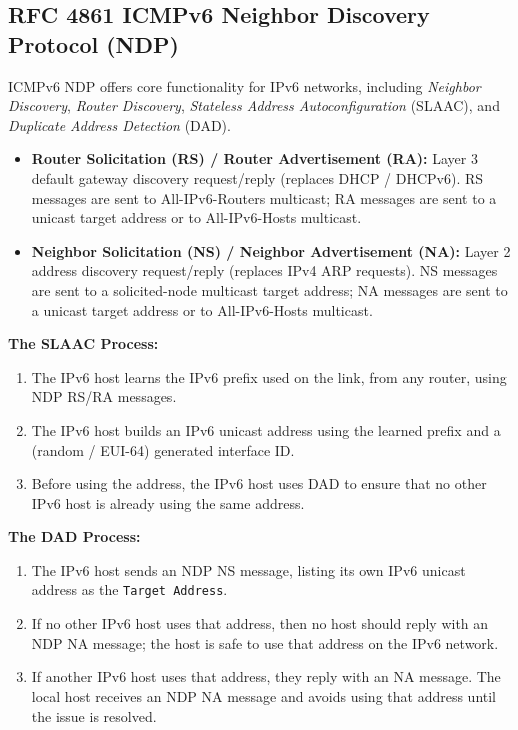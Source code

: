 \documentclass[12pt]{article}
\begin{document}
	\subsection{RFC 4861 ICMPv6 Neighbor Discovery Protocol (NDP) \label{subsec:NDP}}
	ICMPv6 NDP offers core functionality for IPv6 networks, including \textit{Neighbor Discovery}, \textit{Router Discovery}, \textit{Stateless Address Autoconfiguration} (SLAAC), and \textit{Duplicate Address Detection} (DAD).

	\begin{itemize}
		\label{itm:NDP MESSAGES}
		\item{\textbf{Router Solicitation (RS) / Router Advertisement (RA):} Layer 3 default gateway discovery request/reply (replaces DHCP / DHCPv6). RS messages are sent to All-IPv6-Routers multicast; RA messages are sent to a unicast target address or to All-IPv6-Hosts multicast.}
		\item{\textbf{Neighbor Solicitation (NS) / Neighbor Advertisement (NA):} Layer 2 address discovery request/reply (replaces IPv4 ARP requests). NS messages are sent to a solicited-node multicast target address; NA messages are sent to a unicast target address or to All-IPv6-Hosts multicast.}
	\end{itemize}

	\noindent\textbf{The SLAAC Process:}
	\begin{enumerate}
		\label{itm:NDP SLAAC}
		\item{The IPv6 host learns the IPv6 prefix used on the link, from any router, using NDP RS/RA messages.}
		\item{The IPv6 host builds an IPv6 unicast address using the learned prefix and a (random / EUI-64) generated interface ID.}
		\item{Before using the address, the IPv6 host uses DAD to ensure that no other IPv6 host is already using the same address.}
	\end{enumerate}

	\noindent\textbf{The DAD Process:}
	\begin{enumerate}
		\label{itm:NDP DAD}
		\item{The IPv6 host sends an NDP NS message, listing its own IPv6 unicast address as the \texttt{Target Address}.}
		\item{If no other IPv6 host uses that address, then no host should reply with an NDP NA message; the host is safe to use that address on the IPv6 network.}
		\item{If another IPv6 host uses that address, they reply with an NA message. The local host receives an NDP NA message and avoids using that address until the issue 			is resolved.}
	\end{enumerate}
\end{document}
